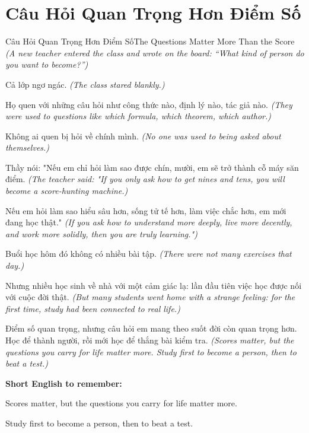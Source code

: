 \section{Câu Hỏi Quan Trọng Hơn Điểm Số}
\begin{truyen}{Câu Hỏi Quan Trọng Hơn Điểm Số}{The Questions Matter More Than the Score}
\textit{(A new teacher entered the class and wrote on the board: ``What kind of person do you want to become?'')}

Cả lớp ngơ ngác.
\textit{(The class stared blankly.)}

Họ quen với những câu hỏi như công thức nào, định lý nào, tác giả nào.
\textit{(They were used to questions like which formula, which theorem, which author.)}

Không ai quen bị hỏi về chính mình.
\textit{(No one was used to being asked about themselves.)}

Thầy nói: "Nếu em chỉ hỏi làm sao được chín, mười, em sẽ trở thành cỗ máy săn điểm.
\textit{(The teacher said: "If you only ask how to get nines and tens, you will become a score-hunting machine.)}

Nếu em hỏi làm sao hiểu sâu hơn, sống tử tế hơn, làm việc chắc hơn, em mới đang học thật."
\textit{(If you ask how to understand more deeply, live more decently, and work more solidly, then you are truly learning.")}

Buổi học hôm đó không có nhiều bài tập.
\textit{(There were not many exercises that day.)}

Nhưng nhiều học sinh về nhà với một cảm giác lạ: lần đầu tiên việc học được nối với cuộc đời thật.
\textit{(But many students went home with a strange feeling: for the first time, study had been connected to real life.)}

\end{truyen}

\begin{baihoc}
Điểm số quan trọng, nhưng câu hỏi em mang theo suốt đời còn quan trọng hơn. Học để thành người, rồi mới học để thắng bài kiểm tra.
\textit{(Scores matter, but the questions you carry for life matter more. Study first to become a person, then to beat a test.)}
\end{baihoc}

\begin{ghinhoanh}
\textbf{Short English to remember:}

Scores matter, but the questions you carry for life matter more.

Study first to become a person, then to beat a test.

\end{ghinhoanh}

